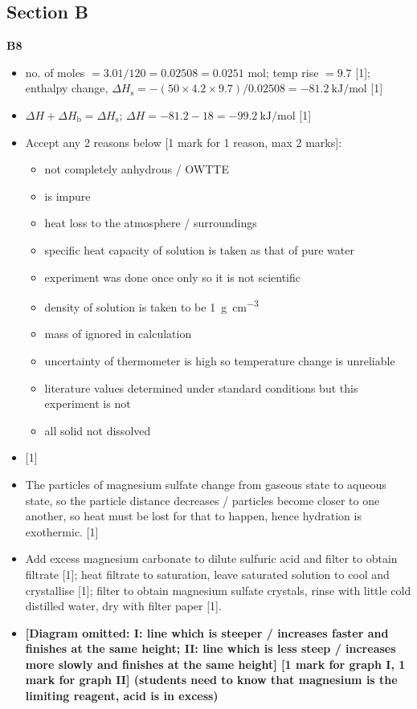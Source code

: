 \documentclass[11pt]{exam}
\begin{document}
\subsection*{Section B}

\textbf{B8}
\begin{itemize}
\item[(a)] no. of moles $= 3.01/120 = 0.02508 = 0.0251$ mol; temp rise $= 9.7$ \celsius{} [1]; enthalpy change, $\Delta H_{\text{s}} = -(50 \times 4.2 \times 9.7)/0.02508 = \qty{-81.2}{\kJ\per\mol}$ [1]

\item[(b)(i)] $\Delta H + \Delta H_{\text{b}} = \Delta H_{\text{s}}$; $\Delta H = -81.2 - 18 = \qty{-99.2}{\kJ\per\mol}$ [1]

\item[(b)(ii)] Accept any 2 reasons below [1 mark for 1 reason, max 2 marks]:
\begin{itemize}
\item {} not completely anhydrous / OWTTE
\item {} is impure
\item heat loss to the atmosphere / surroundings
\item specific heat capacity of solution is taken as that of pure water
\item experiment was done once only so it is not scientific
\item density of solution is taken to be \qty{1}{\g\per\cm\cubed}
\item mass of  ignored in calculation
\item uncertainty of thermometer is high so temperature change is unreliable
\item literature values determined under standard conditions but this experiment is not
\item all solid not dissolved
\end{itemize}

\item[(c)(i)]  [1]

\item[(c)(ii)] The particles of magnesium sulfate change from gaseous state to aqueous state, so the particle distance decreases / particles become closer to one another, so heat must be lost for that to happen, hence hydration is exothermic. [1]

\item[(d)(i)] Add excess magnesium carbonate to dilute sulfuric acid and filter to obtain filtrate [1]; heat filtrate to saturation, leave saturated solution to cool and crystallise [1]; filter to obtain magnesium sulfate crystals, rinse with little cold distilled water, dry with filter paper [1].

\item[(d)(ii)] \textbf{[Diagram omitted: I: line which is steeper / increases faster and finishes at the same height; II: line which is less steep / increases more slowly and finishes at the same height] \hfill [1 mark for graph I, 1 mark for graph II] (students need to know that magnesium is the limiting reagent, acid is in excess)}
\end{itemize}
\end{document}
